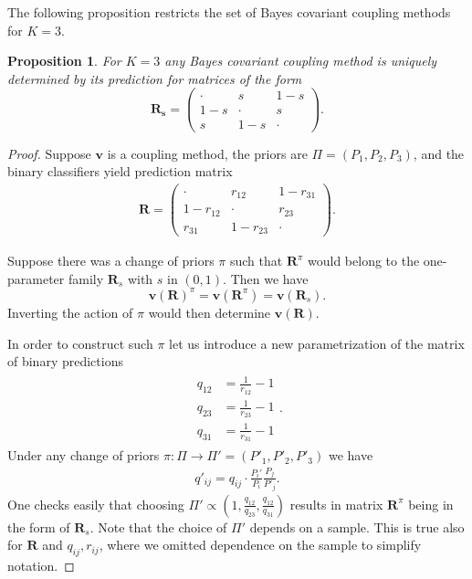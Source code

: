 \documentclass[pdflatex, sn-basic]{sn-jnl}%
\newtheorem{prop}{Proposition}
\theoremstyle{thmstyleone}%
\theoremstyle{thmstyletwo}%
\theoremstyle{thmstylethree}%
\begin{document}
\begin{appendices}
The following proposition restricts the set of Bayes covariant coupling methods for $K=3$.

\begin{prop} \label{prop:bc3}
	For $K=3$ any Bayes covariant coupling method is uniquely determined by its prediction for  matrices of the form
	$$
	\boldsymbol{R_s} = \begin{pmatrix} \cdot & s & 1 -s \\  1-s & \cdot & s \\ s & 1-s & \cdot \end{pmatrix}.
	$$
\end{prop}
\begin{proof}
	Suppose $\boldsymbol{v}$ is a coupling method,  the priors are $\Pi = (P_1, P_2,P_3)$, and the binary classifiers yield prediction matrix 
	\begin{align}
		\boldsymbol{R} = \begin{pmatrix} \cdot & r_{12} & 1 - r_{31} \\ 1-r_{12} & \cdot & r_{23} \\
			r_{31} & 1- r_{23} & \cdot \end{pmatrix}.
	\end{align}
	
	Suppose there was a change of priors $\pi$ such that $\boldsymbol{R}^\pi$ would belong to the one-parameter family $\boldsymbol{R}_s$ with $s$ in $(0,1)$. Then we have
	$$
	\boldsymbol{v}(\boldsymbol{R})^\pi = \boldsymbol{v}(\boldsymbol{R}^\pi) = \boldsymbol{v}(\boldsymbol{R}_s).
	$$
	Inverting the action of $\pi$ would then determine $\boldsymbol{v}(\boldsymbol{R})$.
	
	In order to construct such $\pi$ let us introduce a new parametrization of the matrix of binary  predictions
	\begin{align}
		\begin{split}
			q_{12} &= \frac{1}{r_{12}} -1 \\
			q_{23} &= \frac{1}{r_{23}} -1 \\
			q_{31} &= \frac{1}{r_{31}} -1 
		\end{split}.
	\end{align}
	Under any change of priors $\pi:\Pi \rightarrow \Pi' = (P'_1, P'_2, P'_3)$ we have
	\begin{align}
		q'_{ij}	= q_{ij} \cdot \frac{P_i'}{P_i} \frac{P_j}{P'_j}.
	\end{align}
	One checks easily that choosing $\Pi' \propto (1, \frac{q_{12}}{q_{23}}, \frac{q_{12}}{q_{31}})$ results in matrix $\boldsymbol{R}^\pi$ being in the form of $\boldsymbol{R}_s$. Note that the choice of $\Pi'$ depends on a sample. This is true also for 
$\boldsymbol{R}$ and $q_{ij}, r_{ij}$, where we omitted dependence on the sample to simplify notation.
	

\end{proof}
\end{appendices}
\end{document}
